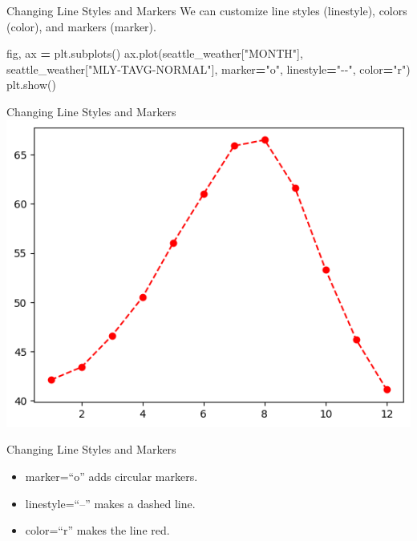 \documentclass[
  ignorenonframetext,
]{beamer}
\newenvironment{Shaded}{\begin{snugshade}}{\end{snugshade}}
\newcommand{\NormalTok}[1]{#1}
\newcommand{\OperatorTok}[1]{\textcolor[rgb]{0.81,0.36,0.00}{\textbf{#1}}}
\newcommand{\StringTok}[1]{\textcolor[rgb]{0.31,0.60,0.02}{#1}}
\providecommand{\tightlist}{%
  \setlength{\itemsep}{0pt}\setlength{\parskip}{0pt}}
\begin{document}
\begin{frame}[fragile]{Changing Line Styles and Markers}
\label{changing-line-styles-and-markers}
We can customize line styles (linestyle), colors (color), and markers
(marker).


\begin{Shaded}
\begin{Highlighting}[]
\NormalTok{fig, ax }\OperatorTok{=}\NormalTok{ plt.subplots()}
\NormalTok{ax.plot(seattle\_weather[}\StringTok{"MONTH"}\NormalTok{], seattle\_weather[}\StringTok{"MLY{-}TAVG{-}NORMAL"}\NormalTok{], marker}\OperatorTok{=}\StringTok{"o"}\NormalTok{, linestyle}\OperatorTok{=}\StringTok{"{-}{-}"}\NormalTok{, color}\OperatorTok{=}\StringTok{"r"}\NormalTok{)}
\NormalTok{plt.show()}
\end{Highlighting}
\end{Shaded}
\end{frame}

\begin{frame}{Changing Line Styles and Markers}
\label{changing-line-styles-and-markers-1}
\includegraphics{../images/im230.png}
\end{frame}

\begin{frame}{Changing Line Styles and Markers}
\label{changing-line-styles-and-markers-2}
\begin{itemize}
\tightlist
\item
  marker=``o'' adds circular markers.
\item
  linestyle=``--'' makes a dashed line.
\item
  color=``r'' makes the line red.
\end{itemize}
\end{frame}
\end{document}
